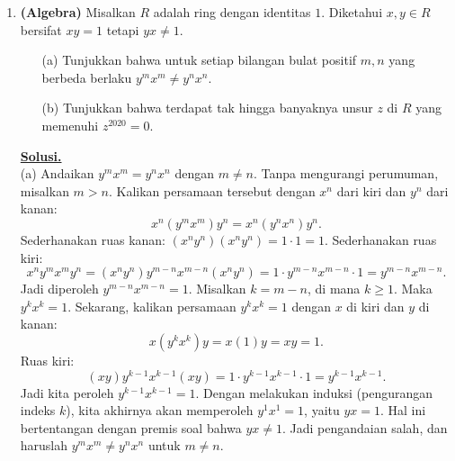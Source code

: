 \documentclass[12pt,twoside]{article}
\newenvironment{solution}
{
	\par\noindent\textbf{\underline{Solusi.}}\\
}
{
	\par
}
\begin{document}
\begin{enumerate}
\begin{solution}
          Menurut teorema dasar analisis real mengenai kekonvergenan barisan fungsi terdiferensial (jika $f_n'$ konvergen seragam dan $f_n(x_0)$ konvergen di satu titik), maka barisan fungsi $(f_n)$ konvergen seragam pada $I$ ke suatu fungsi terdiferensial $f$, dan berlaku $f' = \lim_{n \to \infty} f_n' = h'$.
          Dari kekonvergenan $f_n \to f$, kita juga peroleh nilai awal $f(a) = \lim_{n \to \infty} f_n(a) = g(a)$.

          \textbf{Bukti ketaksamaan:}
          Diketahui $f_n'(t) \geq g'(t)$ untuk setiap $t \in I, t > a$.
          Karena $f_n' \to f'$ (secara seragam, maka juga titik demi titik), maka dengan mengambil limit pada ketaksamaan, kita peroleh:
          \[ f'(t) \geq g'(t) \quad \text{untuk setiap } t > a. \]
          Definisikan fungsi selisih $D(x) = f(x) - g(x)$.
          Turunannya adalah $D'(x) = f'(x) - g'(x) \geq 0$ untuk $x > a$.
          Ini berarti fungsi $D(x)$ monoton naik (non-decreasing) pada interval $\{x \in I \mid x \ge a\}$.
          Sehingga, untuk setiap $x > a$, berlaku:
          \[ D(x) \geq D(a). \]
          Kita tahu $D(a) = f(a) - g(a) = g(a) - g(a) = 0$.
          Maka $D(x) \geq 0 \implies f(x) - g(x) \geq 0 \implies f(x) \geq g(x)$.
          Terbukti.
        \end{solution}

  \item \textbf{(Algebra)} Misalkan $R$ adalah ring dengan identitas $1$. Diketahui $x, y \in R$ bersifat $xy = 1$ tetapi $yx \ne 1$.
        \begin{enumerate}
          \item[(a)] Tunjukkan bahwa untuk setiap bilangan bulat positif $m, n$ yang berbeda berlaku $y^m x^m \ne y^n x^n$.
          \item[(b)] Tunjukkan bahwa terdapat tak hingga banyaknya unsur $z$ di $R$ yang memenuhi $z^{2020} = 0$.
        \end{enumerate}
        \begin{solution}
          (a) Andaikan $y^m x^m = y^n x^n$ dengan $m \ne n$. Tanpa mengurangi perumuman, misalkan $m > n$.
          Kalikan persamaan tersebut dengan $x^n$ dari kiri dan $y^n$ dari kanan:
          \[ x^n (y^m x^m) y^n = x^n (y^n x^n) y^n. \]
          Sederhanakan ruas kanan: $(x^n y^n) (x^n y^n) = 1 \cdot 1 = 1$.
          Sederhanakan ruas kiri:
          \[ x^n y^m x^m y^n = (x^n y^n) y^{m-n} x^{m-n} (x^n y^n) = 1 \cdot y^{m-n} x^{m-n} \cdot 1 = y^{m-n} x^{m-n}. \]
          Jadi diperoleh $y^{m-n} x^{m-n} = 1$.
          Misalkan $k = m-n$, di mana $k \ge 1$. Maka $y^k x^k = 1$.
          Sekarang, kalikan persamaan $y^k x^k = 1$ dengan $x$ di kiri dan $y$ di kanan:
          \[ x (y^k x^k) y = x (1) y = xy = 1. \]
          Ruas kiri:
          \[ (xy) y^{k-1} x^{k-1} (xy) = 1 \cdot y^{k-1} x^{k-1} \cdot 1 = y^{k-1} x^{k-1}. \]
          Jadi kita peroleh $y^{k-1} x^{k-1} = 1$.
          Dengan melakukan induksi (pengurangan indeks $k$), kita akhirnya akan memperoleh $y^1 x^1 = 1$, yaitu $yx = 1$.
          Hal ini bertentangan dengan premis soal bahwa $yx \ne 1$.
          Jadi pengandaian salah, dan haruslah $y^m x^m \ne y^n x^n$ untuk $m \ne n$.


\end{solution}
\end{enumerate}
\end{document}
